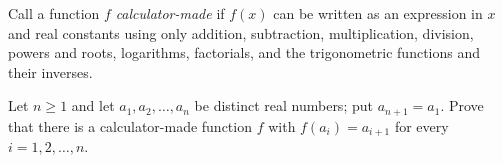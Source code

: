 Call a function $f$ \emph{calculator-made} if $f(x)$ can be written as an expression in $x$ and real constants using only addition, subtraction, multiplication, division, powers and roots, logarithms, factorials, and the trigonometric functions and their inverses.

Let $n\ge1$ and let $a_1,a_2,\dots,a_n$ be distinct real numbers; put $a_{n+1}=a_1$. Prove that there is a calculator-made function $f$ with $f(a_i)=a_{i+1}$ for every $i=1,2,\dots,n$.
